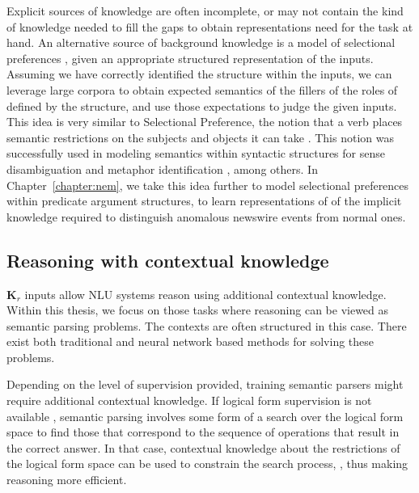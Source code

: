Explicit sources of knowledge are often incomplete, or may not contain the kind of knowledge needed to fill the gaps to obtain representations need for the task at hand. 
An alternative source of background knowledge is a model of selectional preferences \citep{wilks1973preference}, given an appropriate structured representation of the inputs.
Assuming we have correctly identified the structure within the inputs, we can leverage large corpora to obtain expected semantics of the fillers of the roles of
defined by the structure, and use those expectations to judge the given inputs.
This idea is very similar to Selectional Preference, the notion that a verb places semantic
restrictions on the subjects and objects it can take \citep{katz1963structure,wilks1975preferential}.
This notion was successfully used in modeling semantics within syntactic structures
for sense disambiguation \citep{resnik1997selectional} and metaphor identification \citep{shutova2013statistical}, among others.
In Chapter~\ref{chapter:nem}, we take this idea further to model selectional preferences within predicate argument structures, to learn representations
of of the implicit knowledge required to distinguish anomalous newswire events from normal ones.

\subsection{Reasoning with contextual knowledge}
$\textbf{K}_r$ inputs allow NLU systems reason using additional contextual knowledge. Within this thesis, we focus on those tasks where reasoning can be viewed as semantic parsing problems.
The contexts are often structured in this case. There exist both traditional \citep[among others]{Zelle1996LearningTP,Zettlemoyer2005LearningTM,zettlemoyer2007online} and neural network based methods
\citep{Dong2016LanguageTL,Andreas2016LearningTC,Liang2016NeuralSM,Neelakantan2016LearningAN} for solving these problems. 

Depending on the level of supervision provided, training semantic parsers might require additional contextual knowledge. If logical form supervision is not
available \citep{berant2013semantic,pasupat2015compositional,krishnamurthy2017neural}, semantic parsing involves some form of a search over the logical form space to find
those that correspond to the sequence of operations that result in the correct answer.
In that case, contextual knowledge about the restrictions of the logical form space can be used to constrain the search process, \citep{xiao2016sequence,krishnamurthy2017neural},
thus making reasoning more efficient.

